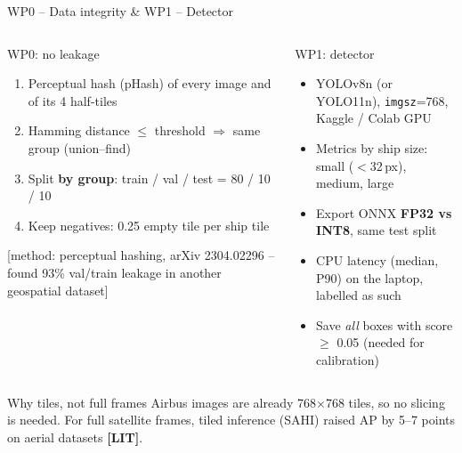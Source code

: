 \documentclass[aspectratio=169,10pt]{beamer}
\newcommand{\src}[1]{{\scriptsize\color{muted}[#1]}}
\newcommand{\LITtag}{\textcolor{muted}{\textbf{[LIT]}}}
\begin{document}
\begin{frame}{WP0 -- Data integrity \quad \& \quad WP1 -- Detector}
\begin{columns}[T]
\begin{block}{WP0: no leakage}
\footnotesize
\begin{enumerate}
  \item Perceptual hash (pHash) of every image and of its 4 half-tiles
  \item Hamming distance $\leq$ threshold $\Rightarrow$ same group (union--find)
  \item Split \textbf{by group}: train / val / test = 80 / 10 / 10
  \item Keep negatives: 0.25 empty tile per ship tile
\end{enumerate}
\src{method: perceptual hashing, arXiv 2304.02296 -- found 93\% val/train leakage in another geospatial dataset}
\end{block}
\begin{block}{WP1: detector}
\footnotesize
\begin{itemize}
  \item YOLOv8n (or YOLO11n), \texttt{imgsz}=768, Kaggle / Colab GPU
  \item Metrics by ship size: small ($<$32\,px), medium, large
  \item Export ONNX \textbf{FP32 vs INT8}, same test split
  \item CPU latency (median, P90) on the laptop, labelled as such
  \item Save \emph{all} boxes with score $\geq$ 0.05 (needed for calibration)
\end{itemize}
\end{block}
\end{columns}
\vspace{2mm}
\begin{exampleblock}{Why tiles, not full frames}
\footnotesize Airbus images are already 768$\times$768 tiles, so no slicing is needed. For full satellite frames, tiled inference (SAHI) raised AP by 5--7 points on aerial datasets \LITtag.
\end{exampleblock}
\end{frame}
\end{document}
